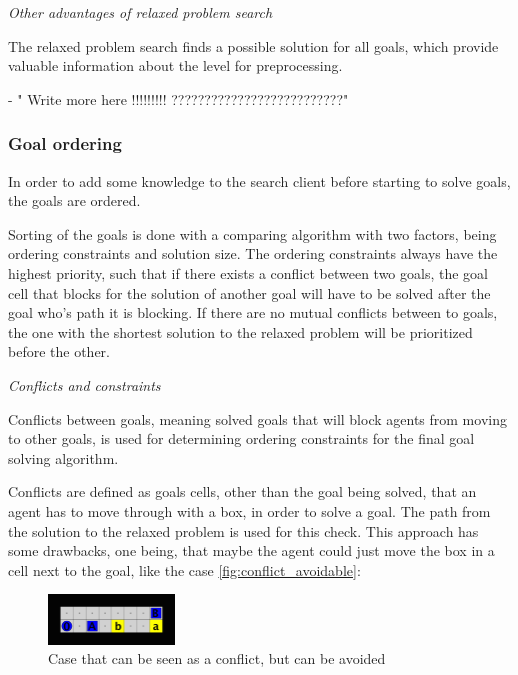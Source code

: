 \documentclass[Main]{subfiles}
\begin{document}
\textit{Other advantages of relaxed problem search}

The relaxed problem search finds a possible solution for all goals, which provide valuable information about the level for preprocessing. 



- " Write more here !!!!!!!!! ??????????????????????????"



\subsubsection{Goal ordering}

In order to add some knowledge to the search client before starting to solve goals, the goals are ordered. 

Sorting of the goals is done with a comparing algorithm with two factors, being ordering constraints and solution size. The ordering constraints always have the highest priority, such that if there exists a conflict between two goals, the goal cell that blocks for the solution of another goal will have to be solved after the goal who's path it is blocking. If there are no mutual conflicts between to goals, the one with the shortest solution to the relaxed problem will be prioritized before the other. 


\textit{Conflicts and constraints}

Conflicts between goals, meaning solved goals that will block agents from moving to other goals, is used for determining ordering constraints for the final goal solving algorithm. 

Conflicts are defined as goals cells, other than the goal being solved, that an agent has to move through with a box, in order to solve a goal. The path from the solution to the relaxed problem is used for this check. This approach has some drawbacks, one being, that maybe the agent could just move the box in a cell next to the goal, like the case \autoref{fig:conflict_avoidable}:
\begin{figure}[h!]
    \centering
    \includegraphics[width=0.3\textwidth]{conflict.png}
    \caption{Case that can be seen as a conflict, but can be avoided}
    \label{fig:conflict_avoidable}
\end{figure}
\end{document}
